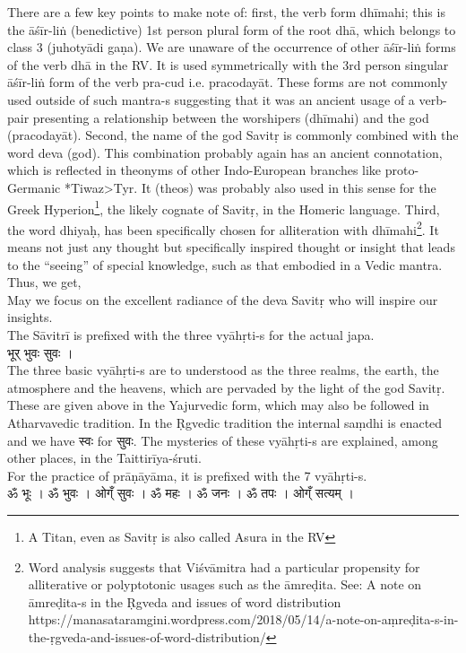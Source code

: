 \documentclass[12pt]{article}
\begin{document}
There are a few key points to make note of: first, the verb form dhīmahi; this is the āśīr-liṅ (benedictive) 1st person plural form of the root dhā, which belongs to class 3 (juhotyādi gaṇa). We are unaware of the occurrence of other āśīr-liṅ forms of the verb dhā in the RV. It is used symmetrically with the 3rd person singular āśīr-liṅ form of the verb pra-cud i.e. pracodayāt. These forms are not commonly used outside of such mantra-s suggesting that it was an ancient usage of a verb-pair presenting a relationship between the worshipers (dhīmahi) and the god (pracodayāt). Second, the name of the god Savitṛ is commonly combined with the word deva (god). This combination probably again has an ancient connotation, which is reflected in theonyms of other Indo-European branches like proto-Germanic *Tiwaz>Tyr. It (theos) was probably also used in this sense for the Greek Hyperion\footnote{A Titan, even as Savitṛ is also called Asura in the RV}, the likely cognate of Savitṛ, in the Homeric language. Third, the word dhiyaḥ, has been specifically chosen for alliteration with dhīmahi\footnote{Word analysis suggests that Viśvāmitra had a particular propensity for alliterative or polyptotonic usages such as the āmreḍita. See: A note on āmreḍita-s in the Ṛgveda and issues of word distribution https://manasataramgini.wordpress.com/2018/05/14/a-note-on-aṃreḍita-s-in-the-ṛgveda-and-issues-of-word-distribution/}. It means not just any thought but specifically inspired thought or insight that leads to the ``seeing'' of special knowledge, such as that embodied in a Vedic mantra. Thus, we get,\\[8pt]
May we focus on the excellent radiance of the deva Savitṛ who will inspire our insights.\\[10pt]
The Sāvitrī is prefixed with the three vyāhṛti-s for the actual japa. \\
{\skt भूर् भुवः सुवः ।
}\\
The three basic vyāhṛti-s are to understood as the three realms, the earth, the atmosphere and the heavens, which are pervaded by the light of the god Savitṛ. These are given above in the Yajurvedic form, which may also be followed in Atharvavedic tradition. In the Ṛgvedic tradition the internal saṃdhi is enacted and we have {\skt स्वः } for {\skt सुवः}. The mysteries of these vyāhṛti-s are explained, among other places, in the Taittirīya-śruti. \\[10pt]
 For the practice of prāṇāyāma, it is prefixed with the 7 vyāhṛti-s.\\
{\skt ॐ भूः । ॐ भुवः । ओग्ँ सुवः । ॐ महः । ॐ जनः । ॐ तपः । ओग्ँ सत्यम् ।
}\\
\end{document}
